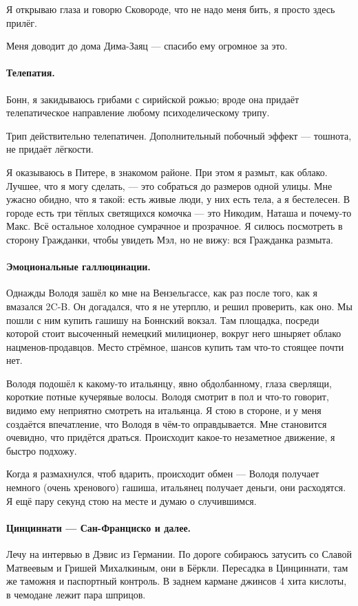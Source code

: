 \documentclass{book}
\begin{document}
Я открываю глаза и говорю Сковороде, что не надо меня бить, я просто здесь прилёг.

Меня доводит до дома Дима-Заяц --- спасибо ему огромное за это.

\paragraph{Телепатия.}
Бонн, я закидываюсь грибами с сирийской рожью;
вроде она придаёт телепатическое направление любому психоделическому трипу.

Трип действительно телепатичен.
Дополнительный побочный эффект --- тошнота, не придаёт лёгкости.

Я оказываюсь в Питере, в знакомом районе.
При этом я размыт, как облако.
Лучшее, что я могу сделать, --- это собраться до размеров одной улицы.
Мне ужасно обидно, что я такой: есть живые люди, у них есть тела, а я бестелесен.
В городе есть три тёплых светящихся комочка --- это Никодим, Наташа и почему-то Макс.
Всё остальное холодное сумрачное и прозрачное.
Я силюсь посмотреть в сторону Гражданки, чтобы увидеть Мэл, но не вижу: вся Гражданка размыта.

\paragraph{Эмоциональные галлюцинации.} 
Однажды Володя зашёл ко мне на Вензельгассе, как раз после того, как я вмазался 2C-B.
Он догадался, что я не утерплю, и решил проверить, как оно.
Мы пошли с ним купить гашишу на Боннский вокзал.
Там площадка, посреди которой стоит высоченный немецкий милиционер, вокруг него шныряет облако нацменов-продавцов.
Место стрёмное, шансов купить там что-то стоящее почти нет.

Володя подошёл к какому-то итальянцу, явно обдолбанному, глаза сверлящи, короткие потные кучерявые волосы.
Володя смотрит в пол и что-то говорит, видимо ему неприятно смотреть на итальянца.
Я стою в стороне, и у меня создаётся впечатление, что Володя в чём-то оправдывается.
Мне становится очевидно, что придётся драться.
Происходит какое-то незаметное движение, я быстро подхожу.

Когда я размахнулся, чтоб вдарить, происходит обмен --- Володя получает немного (очень хренового) гашиша, итальянец получает деньги, они расходятся.
Я ещё пару секунд стою на месте и думаю о случившимся.

\paragraph{Цинциннати --- Сан-Франциско и далее.}
Лечу на интервью в Дэвис из Германии.
По дороге собираюсь затусить со Славой Матвеевым и Гришей Михалкиным, они в Бёркли.
Пересадка в Цинциннати, там же таможня и паспортный контроль.
В заднем кармане джинсов 4 хита кислоты, в чемодане лежит пара шприцов.
\end{document}
